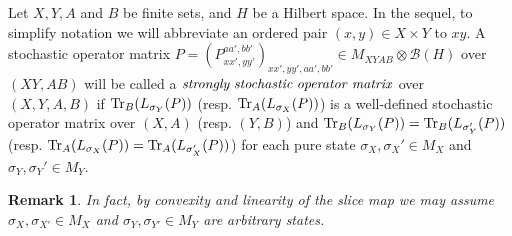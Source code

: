 \documentclass[11pt]{amsart}
\newtheorem{remark}[theorem]{Remark}
\newcommand{\cl}[1]{\mathcal{#1}}
\begin{document}
Let $X, Y, A$ and $B$ be finite sets, and $H$ be a Hilbert space. In the sequel, to simplify notation we will abbreviate an ordered pair $(x, y) \in X\times Y$ to $xy$. A stochastic operator matrix $P = (P_{xx', yy'}^{aa', bb'})_{xx', yy', aa', bb'} \in M_{XYAB}\otimes \cl{B}(H)$ over $(XY, AB)$ will be called a ${\it strongly \; stochastic \; operator \; matrix}$ over $(X, Y, A, B)$ if ${\rm Tr}_{B}(L_{\sigma_{Y}}(P))$ (resp. ${\rm Tr}_{A}(L_{\sigma_{X}}(P))$) is a well-defined stochastic operator matrix over $(X, A)$ (resp. $(Y, B)$) and ${\rm Tr}_{B}(L_{\sigma_{Y}}(P)) = {\rm Tr}_{B}(L_{\sigma_{Y}'}(P))$ (resp. ${\rm Tr}_{A}(L_{\sigma_{X}}(P)) = {\rm Tr}_{A}(L_{\sigma_{X}'}(P))$) for each pure state $\sigma_{X}, \sigma_{X}' \in M_{X}$ and $\sigma_{Y}, \sigma_{Y}' \in M_{Y}$.

\begin{remark}
\rm In fact, by convexity and linearity of the slice map we may assume $\sigma_{X}, \sigma_{X'} \in M_{X}$ and $\sigma_{Y}, \sigma_{Y'} \in M_{Y}$ are arbitrary states.
\end{remark}
\end{document}
